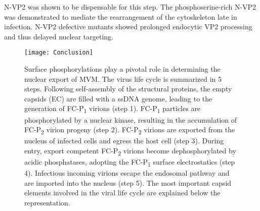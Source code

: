 N-VP2 was shown to be dispensable for this step. The phosphoserine-rich N-VP2 was demonstrated to mediate the rearrangement of the cytoskeleton late in infection. N-VP2 defective mutants showed prolonged endocytic VP2 processing and thus delayed nuclear targeting.       
   







\begin{figure}[H]
\centering
  \texttt{[image: Conclusion]}
  \caption[Schematic representation of nuclear import and export of MVM.]
   {Surface phosphorylations play a pivotal role in determining the nuclear export of MVM. The virus life cycle is summarized in 5 steps. Following self-assembly of the structural proteins, the empty capsids (EC) are filled with a ssDNA genome, leading to the generation of FC-P\textsubscript{1} virions (step 1). FC-P\textsubscript{1} particles are phosphorylated by a nuclear kinase, resulting in the accumulation of FC-P\textsubscript{2} virion progeny (step 2). FC-P\textsubscript{2} virions are exported from the nucleus of infected cells and egress the host cell (step 3). During entry, export competent FC-P\textsubscript{2} virions become dephosphorylated by acidic phosphatases, adopting the FC-P\textsubscript{1} surface electrostatics (step 4). Infectious incoming virions escape the endosomal pathway and are imported into the nucleus (step 5). The most important capsid elements involved in the viral life cycle are explained below the representation.} 
\label{Scheme}
\end{figure}















